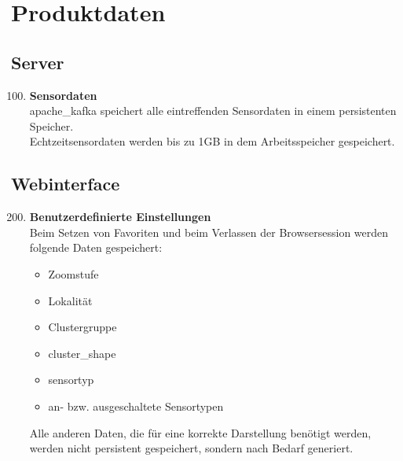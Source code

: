 \chapter{Produktdaten}
\section{Server}
\begin{enumerate}[label=\textbf{PD\arabic{enumi}0}]
	\setcounter{enumi}{99}
	\item \textbf{Sensordaten}\\
	\gls{apache_kafka} speichert alle eintreffenden Sensordaten in einem persistenten Speicher.\\
	Echtzeitsensordaten werden bis zu 1GB in dem Arbeitsspeicher gespeichert.
\end{enumerate}
\section{Webinterface}
\begin{enumerate}[label=\textbf{PD\arabic{enumi}0}]
	\setcounter{enumi}{199}
	\item \textbf{Benutzerdefinierte Einstellungen}\\
	Beim Setzen von Favoriten und beim Verlassen der Browsersession werden folgende Daten gespeichert:
	\begin{itemize}
		\item Zoomstufe
		\item Lokalität
		\item Clustergruppe
		\item \gls{cluster_shape}
		\item \gls{sensortyp}
		\item an- bzw. ausgeschaltete Sensortypen
	\end{itemize}
	Alle anderen Daten, die für eine korrekte Darstellung benötigt werden, werden nicht persistent gespeichert, sondern nach Bedarf generiert.
\end{enumerate}